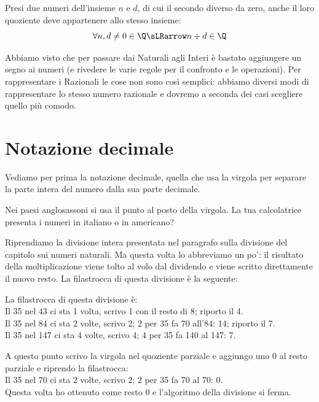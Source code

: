 Presi due numeri dell'insieme \(n\) e \(d\), di cui il secondo diverso da zero, 
anche il loro quoziente deve appartenere allo stesso insieme:
\[\forall n, d \neq 0 \in \Q \sLRarrow n \div d \in \Q\]

Abbiamo visto che per passare dai Naturali agli Interi è bastato aggiungere 
un segno ai numeri (e rivedere le varie regole per il confronto e le 
operazioni).
Per rappresentare i Razionali le cose non sono così semplici: abbiamo 
diversi modi di rappresentare lo stesso numero razionale e dovremo a 
seconda dei casi scegliere quello più comodo.

\section{Notazione decimale}
\label{sec:razionali_notazione_decimale}

Vediamo per prima la notazione decimale, quella che usa la virgola per 
separare la parte intera del numero dalla sua parte decimale.

\begin{osservazione}
 Nei paesi anglosassoni si usa il punto al posto della virgola. La tua 
calcolatrice presenta i numeri in italiano o in americano?
\end{osservazione}

Riprendiamo la divisione intera presentata nel paragrafo sulla divisione 
del capitolo sui numeri naturali.
Ma questa volta lo abbreviamo un po': il risultato della moltiplicazione 
viene tolto al volo dal dividendo e viene scritto direttamente il nuovo 
resto. 
La filastrocca di questa divisione è la seguente:

\begin{minipage}[]{.59\textwidth}
\begin{center}\end{center}
\end{minipage}
\begin{minipage}[]{.39\textwidth}
La filastrocca di questa divisione è:\\
Il 35 nel 43 ci sta 1 volta, scrivo 1 con il resto di 8; riporto il 4.\\
Il 35 nel 84 ci sta 2 volte, scrivo 2; 2 per 35 fa 70 all'84: 14; riporto 
il 7.\\
Il 35 nel 147 ci sta 4 volte, scrivo 4; 4 per 35 fa 140 al 147: 7.\\
\end{minipage}

A questo punto scrivo la virgola nel quoziente parziale e aggiungo uno 0 al 
resto parziale e riprendo la filastrocca:\\
Il 35 nel 70 ci sta 2 volte, scrivo 2; 2 per 35 fa 70 al 70: 0.\\
Questa volta ho ottenuto come resto 0 e l'algoritmo della divisione si 
ferma.

